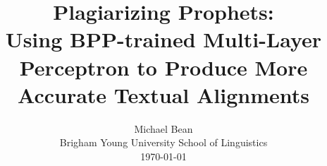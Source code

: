 \title{Plagiarizing Prophets:\\
Using BPP-trained Multi-Layer Perceptron to Produce More Accurate Textual Alignments}

\author{Michael Bean\\
Brigham Young University School of Linguistics\\
\today}
\maketitle
